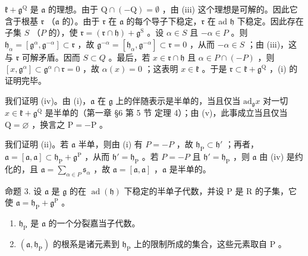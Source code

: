 \(\mathfrak{k} + \mathfrak{g}^{\mathrm{Q}}\) 是 \(\mathfrak{a}\) 的理想。由于 \(\mathrm{Q} \cap (-\mathrm{Q}) = \emptyset\) ，由 (iii) 这个理想是可解的。因此它含于根基 \(\mathfrak{r}\) （\(\mathfrak{a}\) 的）。由于 \(\mathfrak{r}\) 在 \(\mathfrak{a}\) 的每个导子下稳定，\(\mathfrak{r}\) 在 ad \(\mathfrak{h}\) 下稳定。因此存在子集 \(S\) （\(P\) 的），使 \(\mathfrak{r} = (\mathfrak{r} \cap \mathfrak{h}) + \mathfrak{g}^{\mathrm{S}}\) 。设 \(\alpha \in S\) 且 \(-\alpha \in P\) 。则 \(\mathfrak{h}_{\alpha} = [\mathfrak{g}^{\alpha}, \mathfrak{g}^{-\alpha}] \subset \mathfrak{r}\) ，故 \(\mathfrak{g}^{-\alpha} = [\mathfrak{h}_{\alpha}, \mathfrak{g}^{-\alpha}] \subset \mathfrak{r} = 0\) ，从而 \(-\alpha \in S\) ；由 (iii)，这与 \(\mathfrak{r}\) 可解矛盾。因而 \(S \subset Q\) 。最后，若 \(x \in \mathfrak{r} \cap \mathfrak{h}\) 且 \(\alpha \in P \cap (-P)\) ，则 \([x, \mathfrak{g}^{\alpha}] \subset \mathfrak{g}^{\alpha} \cap \mathfrak{r} = 0\) ，故 \(\alpha(x) = 0\) ；这表明 \(x \in \mathfrak{k}\) 。于是 \(\mathfrak{r} \subset \mathfrak{k} + \mathfrak{g}^{\mathrm{Q}}\) ，(i) 的证明完毕。

我们证明 (iv)。由 (i)，\(\mathfrak{a}\) 在 \(\mathfrak{g}\) 上的伴随表示是半单的，当且仅当 \(\mathrm{ad}_{\mathfrak{g}}x\) 对一切 \(x\in \mathfrak{k} + \mathfrak{g}^{\mathrm{Q}}\) 是半单的（第一章 §6 第 5 节 定理 4）；由 (v)，此事成立当且仅当 \(\mathrm{Q} = \varnothing\) ，换言之 \(\mathrm{P} = -\mathrm{P}\) 。

我们证明 (ii)。若 \(\mathfrak{a}\) 半单，则由 (i) 有 \(P = -P\) ，故 \(\mathfrak{h}_{\mathrm{P}} \subset \mathfrak{h}'\) ；再者，\(\mathfrak{a} = [\mathfrak{a}, \mathfrak{a}] \subset \mathfrak{h}_{\mathrm{P}} + \mathfrak{g}^{\mathrm{P}}\) ，从而 \(\mathfrak{h}' = \mathfrak{h}_{\mathrm{P}}\) 。若 \(P = -P\) 且 \(\mathfrak{h}' = \mathfrak{h}_{\mathrm{P}}\) ，则 \(\mathfrak{a}\) 由 (iv) 是约化的，且 \(\mathfrak{a} = \sum_{\alpha \in P} \mathfrak{s}_{\alpha}\) ，故 \(\mathfrak{a} = [\mathfrak{a}, \mathfrak{a}]\) ，\(\mathfrak{a}\) 是半单的。

命题 3. 设 \(\mathfrak{a}\) 是 \(\mathfrak{g}\) 的在 \(\operatorname{ad}(\mathfrak{h})\) 下稳定的半单子代数，并设 \(\mathrm{P}\) 是 \(\mathrm{R}\) 的子集，它使 \(\mathfrak{a} = \mathfrak{h}_{\mathrm{P}} + \mathfrak{g}^{\mathrm{P}}\) 。

\begin{enumerate}
\def\labelenumi{(\roman{enumi})}
\item
  \(\mathfrak{h}_{\mathrm{P}}\) 是 \(\mathfrak{a}\) 的一个分裂嘉当子代数。
\item
  \((\mathfrak{a},\mathfrak{h}_{\mathrm{P}})\) 的根系是诸元素到 \(\mathfrak{h}_{\mathrm{P}}\) 上的限制所成的集合，这些元素取自 \(\mathrm{P}\) 。
\end{enumerate}

